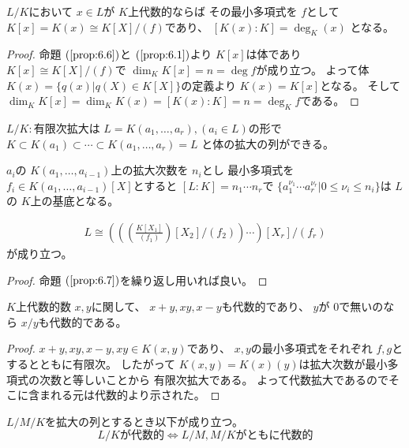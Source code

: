 \documentclass[../master_galois_theory]{subfiles}
\begin{document}
\begin{prop} \label{prop:6.7}
  $L/K$において $x \in L$が $K$上代数的ならば
  その最小多項式を $f$として
  $K[x] = K(x) \cong K[X]/(f)$であり、
  $[K(x):K] = \deg_K (x)$
  となる。
\end{prop}

\begin{proof}
  命題 $(\mathrm{\ref{prop:6.6}})$と $(\mathrm{\ref{prop:6.1}})$より
  $K[x]$は体であり
  $K[x] \cong K[X]/(f)$で $\dim_K K[x] = n = \deg f$が成り立つ。
  よって体 $K(x) = \{ q(x) | q(X) \in K[X] \}$の定義より
  $K(x) = K[x]$となる。
  そして $\dim_K K[x] = \dim_K K(x) = [K(x):K] = n = \deg_K f$である。
\end{proof}

\begin{corl} \label{corl:6.8}
  $L/K:$有限次拡大は
  $L = K(a_1 , \dots , a_r) , (a_i \in L)$の形で
  $K \subset K(a_1) \subset \cdots \subset K(a_1 , \dots , a_r) = L$
  と体の拡大の列ができる。

  $a_i$の $K(a_1 , \dots , a_{i-1})$上の拡大次数を $n_i$とし
  最小多項式を $f_i \in K(a_1 , \dots , a_{i-1})[X]$とすると
  $[L:K] = n_1 \cdots n_r$で
  $\{ a_1^{\nu_1} \cdots a_r^{\nu_r} | 0 \leq \nu_i \leq n_i \}$は
  $L$の $K$上の基底となる。

  \begin{eqnarray*}
    L \cong \left( \left( \left( \frac{K[X_1]}{(f_1)} \right) [X_2]/(f_2) \right) \cdots \right) [X_r]/(f_r)
  \end{eqnarray*}
  が成り立つ。
\end{corl}

\begin{proof}
  命題 $(\mathrm{\ref{prop:6.7}})$を繰り返し用いれば良い。
\end{proof}

\begin{lemm} \label{lemm:daisuuwa}
  $K$上代数的数 $x , y$に関して、 $x + y , xy , x - y$も代数的であり、
  $y$が $0$で無いのなら $x/y$も代数的である。
\end{lemm}

\begin{proof}
  $x + y , xy , x - y , xy \in K(x,y)$であり、
  $x,y$の最小多項式をそれぞれ $f , g$とするとともに有限次。
  したがって $K(x,y) = K(x)(y)$は拡大次数が最小多項式の次数と等しいことから
  有限次拡大である。
  よって代数拡大であるのでそこに含まれる元は代数的より示された。
\end{proof}

\begin{prop}
  $L/M/K$を拡大の列とするとき以下が成り立つ。
  \[
  L/Kが代数的 \Leftrightarrow L/M , M/Kがともに代数的
  \]
\end{prop}
\end{document}
